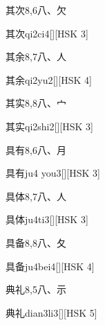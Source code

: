 \begin{entry}{其次}{8,6}{⼋、⽋}
  \begin{phonetics}{其次}{qi2ci4}[][HSK 3]
  \end{phonetics}
\end{entry}

\begin{entry}{其余}{8,7}{⼋、⼈}
  \begin{phonetics}{其余}{qi2yu2}[][HSK 4]
  \end{phonetics}
\end{entry}

\begin{entry}{其实}{8,8}{⼋、⼧}
  \begin{phonetics}{其实}{qi2shi2}[][HSK 3]
  \end{phonetics}
\end{entry}

\begin{entry}{具有}{8,6}{⼋、⽉}
  \begin{phonetics}{具有}{ju4 you3}[][HSK 3]
  \end{phonetics}
\end{entry}

\begin{entry}{具体}{8,7}{⼋、⼈}
  \begin{phonetics}{具体}{ju4ti3}[][HSK 3]
  \end{phonetics}
\end{entry}

\begin{entry}{具备}{8,8}{⼋、⼡}
  \begin{phonetics}{具备}{ju4bei4}[][HSK 4]
  \end{phonetics}
\end{entry}

\begin{entry}{典礼}{8,5}{⼋、⽰}
  \begin{phonetics}{典礼}{dian3li3}[][HSK 5]
  \end{phonetics}
\end{entry}

